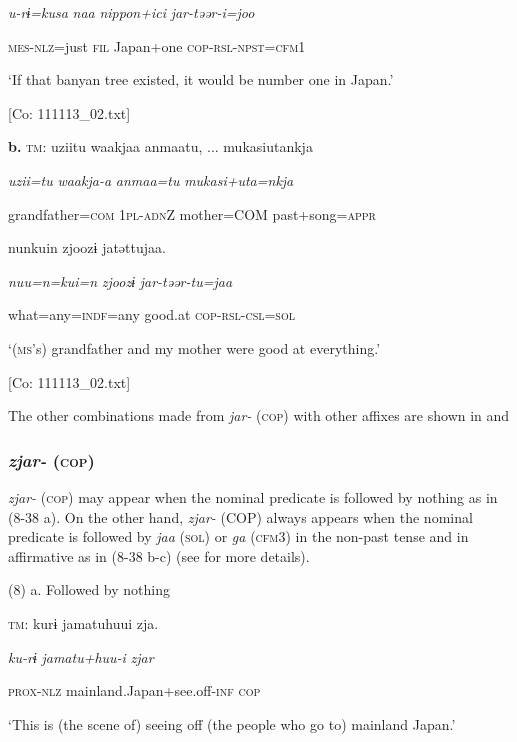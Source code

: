       \textit{u-rɨ=kusa}  \textit{naa}  \textit{nippon+ici}  \textit{jar-təər-i=joo}

      \textsc{mes}-\textsc{nlz}=just  \textsc{fil}  Japan+one  \textsc{cop}-\textsc{rsl}-\textsc{npst}=\textsc{cfm}1

      ‘If that banyan tree existed, it would be number one in Japan.’

      [Co: 111113\_02.txt]

  \textbf{b.}  \textsc{tm}:  uziitu  waakjaa  anmaatu, ...  mukasiutankja

      \textit{uzii=tu}  \textit{waakja-a}  \textit{anmaa=tu}  \textit{mukasi+uta=nkja}

      grandfather=\textsc{com}  1\textsc{pl}-\textsc{adn}Z  mother=COM  past+song=\textsc{appr}

      nunkuin  zjoozɨ  jatəttujaa.

      \textit{nuu=n=kui=n}  \textit{zjoozɨ}  \textit{jar-təər-tu=jaa}

      what=any=\textsc{indf}=any  good.at  \textsc{cop}-\textsc{rsl}-\textsc{csl}=\textsc{sol}

      ‘(\textsc{ms}’s) grandfather and my mother were good at everything.’

      [Co: 111113\_02.txt]

  The other combinations made from \textit{jar-} (\textsc{cop}) with other affixes are shown in  and 

\subsubsection{\textit{zjar-} (\textsc{cop})}

\textit{zjar-} (\textsc{cop}) may appear when the nominal predicate is followed by nothing as in (8-38 a). On the other hand, \textit{zjar-} (COP) always appears when the nominal predicate is followed by \textit{jaa} (\textsc{sol}) or \textit{ga} (\textsc{cfm}3) in the non-past tense and in affirmative as in (8-38 b-c) (see  for more details).

(8)  a. Followed by nothing

  \textsc{tm}:  kurɨ  jamatuhuui  zja.

    \textit{ku-rɨ}  \textit{jamatu+huu-i}  \textit{zjar}

    \textsc{prox}-\textsc{nlz}  mainland.Japan+see.off-\textsc{inf}  \textsc{cop}

    ‘This is (the scene of) seeing off (the people who go to) mainland Japan.’

